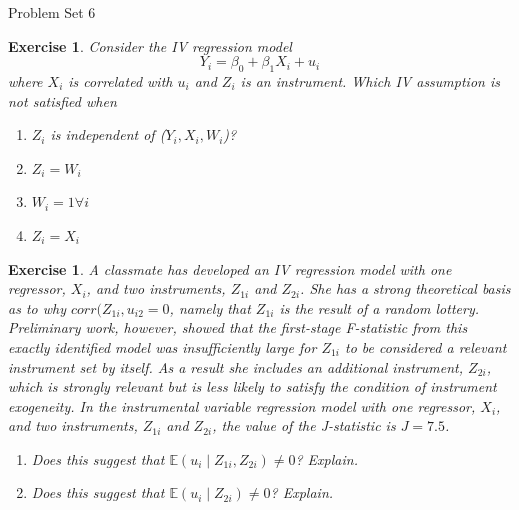 \documentclass{article}
\newtheorem{exercise}[theorem]{Exercise}
\begin{document}
\begin{center}
{\Large Problem Set 6}
\end{center}


\begin{exercise} %
Consider the IV regression model
\begin{equation*}
    Y_i = \beta_0 + \beta_1 X_i + u_i
\end{equation*}
where $X_i$ is correlated with $u_i$ and $Z_i$ is an instrument. Which IV assumption is not satisfied when
\begin{enumerate}[label=\alph*)]
    \item $Z_i$ is independent of ($Y_i, X_i, W_i$)?
    \item $Z_i=W_i$
    \item $W_i = 1 \forall i$
    \item $Z_i = X_i$
\end{enumerate}
\end{exercise}


\begin{exercise} %
A classmate has developed an IV regression model with one regressor, $X_i$, and two instruments, $Z_{1i}$ and $Z_{2i}$. She has a strong theoretical basis as to why $corr(Z_{1i}, u_{i2} = 0$, namely that $Z_{1i}$ is the result of a random lottery. Preliminary work, however, showed that the first-stage F-statistic from this exactly identified model was insufficiently large for $Z_{1i}$ to be considered a relevant instrument set by itself. As a result she includes an additional instrument, $Z_{2i}$, which is strongly relevant but is less likely to satisfy the condition of instrument exogeneity. In the instrumental variable regression model with one regressor, $X_i$, and two instruments, $Z_{1i}$ and $Z_{2i}$, the value of the J-statistic is $J = 7.5$.
\begin{enumerate}[label=\alph*)]
    \item Does this suggest that $\mathbb{E}(u_i \mid Z_{1i}, Z_{2i})\neq 0$? Explain.
    \item Does this suggest that $\mathbb{E}(u_i \mid Z_{2i})\neq 0$? Explain.
\end{enumerate}
\end{exercise}
\end{document}
